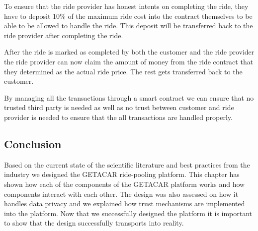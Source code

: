To ensure that the ride provider has honest intents on completing the ride, they have to deposit 10\% of the maximum ride cost into the contract themselves to be able to be allowed to handle the ride. This deposit will be transferred back to the ride provider after completing the ride. 

After the ride is marked as completed by both the customer and the ride provider the ride provider can now claim the amount of money from the ride contract that they determined as the actual ride price. The rest gets transferred back to the customer.

By managing all the transactions through a smart contract we can ensure that no trusted third party is needed as well as no trust between customer and ride provider is needed to ensure that the all transactions are handled properly.

\subsection{Conclusion}
Based on the current state of the scientific literature and best practices from the industry we designed the GETACAR ride-pooling platform. This chapter has shown how each of the components of the GETACAR platform works and how components interact with each other. The design was also assessed on how it handles data privacy and we explained how trust mechanisms are implemented into the platform. Now that we successfully designed the platform it is important to show that the design successfully transports into reality. 